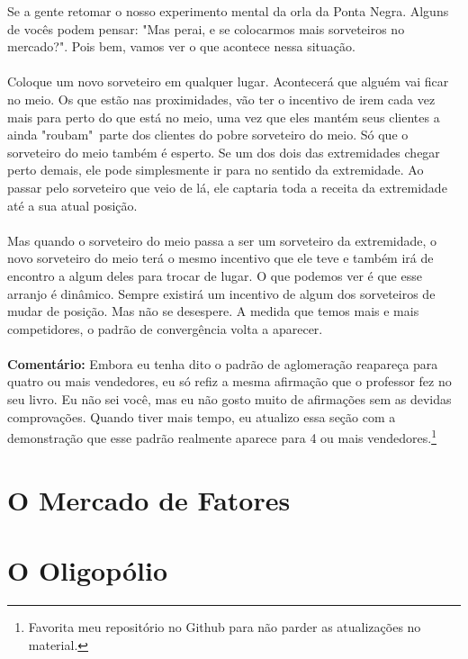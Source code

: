 \documentclass[a4paper,11pt,oneside]{book}
\theoremstyle{definition}
\theoremstyle{break}
\begin{document}
Se a gente retomar o nosso experimento mental da orla da Ponta Negra. Alguns de vocês podem pensar: "Mas perai, e se colocarmos mais sorveteiros no mercado?". Pois bem, vamos ver o que acontece nessa situação.
\\
\\
Coloque um novo sorveteiro em qualquer lugar. Acontecerá que alguém vai ficar no meio. Os que estão nas proximidades, vão ter o incentivo de irem cada vez mais para perto do que está no meio, uma vez que eles mantém seus clientes a ainda "roubam"\ parte dos clientes do pobre sorveteiro do meio. Só que o sorveteiro do meio também é esperto. Se um dos dois das extremidades chegar perto demais, ele pode simplesmente ir para no sentido da extremidade. Ao passar pelo sorveteiro que veio de lá, ele captaria toda a receita da extremidade até a sua atual posição.
\\
\\
Mas quando o sorveteiro do meio passa a ser um sorveteiro da extremidade, o novo sorveteiro do meio terá o mesmo incentivo que ele teve e também irá de encontro a algum deles para trocar de lugar. O que podemos ver é que esse arranjo é dinâmico. Sempre existirá um incentivo de algum dos sorveteiros de mudar de posição. Mas não se desespere. A medida que temos mais e mais competidores, o padrão de convergência volta a aparecer.
\\
\\
\textbf{Comentário:} Embora eu tenha dito o padrão de aglomeração reapareça para quatro ou mais vendedores, eu só refiz a mesma afirmação que o professor fez no seu livro. Eu não sei você, mas eu não gosto muito de afirmações sem as devidas comprovações. Quando tiver mais tempo, eu atualizo essa seção com a demonstração que esse padrão realmente aparece para 4 ou mais vendedores.\footnote{Favorita meu repositório no Github para não parder as atualizações no material.}

\chapter{O Mercado de Fatores}

\chapter{O Oligopólio}

\end{document}
